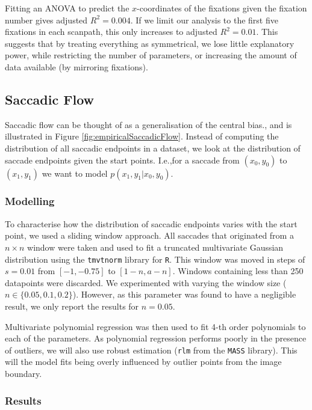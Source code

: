 Fitting an ANOVA to predict the $x$-coordinates of the fixations given the fixation number gives adjusted $R^2=0.004$. If we limit our analysis to the first five fixations in each scanpath, this only increases to adjusted $R^2=0.01$. This suggests that by treating everything as symmetrical, we lose little explanatory power, while restricting the number of parameters, or increasing the amount of data available (by mirroring fixations). 

\subsection{Saccadic Flow}
\label{ModellingFlow}

Saccadic flow can be thought of as a generalisation of the central bias., and is illustrated in Figure \ref{fig:empiricalSaccadicFlow}. Instead of computing the distribution of all saccadic endpoints in a dataset, we look at the distribution of saccade endpoints given the start points. I.e.,for a saccade from $(x_0, y_0)$ to $(x_1, y_1)$ we want to model $p(x_1,y_1|x_0, y_0)$.

\subsubsection{Modelling}

To characterise how the distribution of saccadic endpoints varies with the start point, we used a sliding window approach. All saccades that originated from a $n\times n$ window were taken and used to fit a truncated multivariate Gaussian distribution using the \texttt{tmvtnorm} library for \texttt{R}. This window was moved in steps of $s=0.01$ from $[-1,-0.75]$ to $[1-n, a-n]$. Windows containing less than 250 datapoints were discarded. We experimented with varying the window size ($n\in\{0.05,0.1, 0.2\}$). However, as this parameter was found to have a negligible result, we only report the results for $n=0.05$.

Multivariate polynomial regression was then used to fit 4-th order polynomials to each of the parameters. As polynomial regression performs poorly in the presence of outliers, we will also use robust estimation (\texttt{rlm} from the \texttt{MASS} library). This will the model fits being overly influenced by outlier points from the image boundary. 

\subsubsection{Results}

